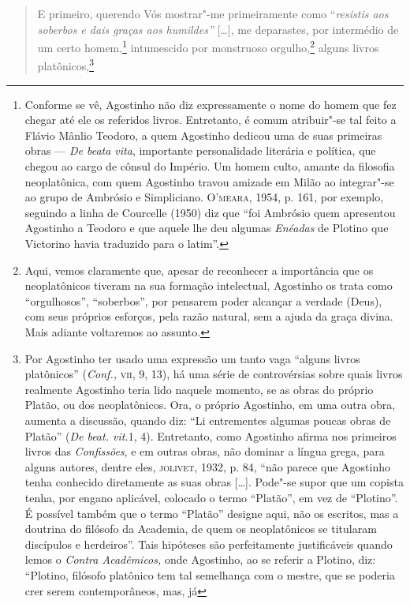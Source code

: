 \begin{quote}
E primeiro, querendo Vós mostrar"-me primeiramente como
``\emph{resistis aos soberbos e dais graças aos humildes''}
[\ldots{}], me deparastes, por intermédio de um certo
homem,\footnote{ Conforme se  vê, Agostinho não diz expressamente
o nome do homem que fez chegar até ele os referidos livros.
Entretanto, é comum atribuir"-se tal feito a Flávio Mânlio
Teodoro, a quem Agostinho dedicou uma de suas primeiras obras ---
\emph{De beata vita}, importante personalidade
literária e política, que chegou ao cargo de cônsul do Império.
Um homem culto, amante da filosofia neoplatônica, com quem
Agostinho travou  amizade em Milão ao integrar"-se ao grupo de
Ambrósio e Simpliciano. O'\textsc{meara}, 1954, p. 161,  por exemplo,
seguindo a linha de Courcelle (1950) diz que “foi Ambrósio quem
apresentou Agostinho a Teodoro e que aquele lhe deu algumas
\emph{Enéadas} de Plotino que Victorino havia traduzido para o
latim”.} intumescido por monstruoso orgulho,\footnote{ Aqui,
vemos claramente que, apesar de reconhecer a importância que os
neoplatônicos tiveram na sua formação intelectual,  Agostinho os
trata como “orgulhosos”, “soberbos”,  por  pensarem poder
alcançar a verdade (Deus), com seus próprios esforços, pela
razão natural, sem a ajuda da graça divina. Mais adiante
voltaremos ao assunto.} alguns livros platônicos,\footnote{ Por
Agostinho ter  usado uma expressão um tanto vaga “alguns livros
platônicos” (\emph{Conf.,} \textsc{vii}, 9, 13),  há uma série de
controvérsias sobre quais livros  realmente Agostinho teria lido
naquele momento, se as obras do próprio  Platão, ou dos
neoplatônicos. Ora, o próprio Agostinho, em uma outra obra,
aumenta  a discussão, quando diz: “Li entrementes algumas
poucas obras de Platão” (\emph{De beat. vit.}1, 4).
Entretanto, como Agostinho afirma nos primeiros livros
das\emph{ Confissões}, e em outras obras, não dominar a língua
grega, para alguns autores, dentre eles, \textsc{jolivet}, 1932, p. 84,
“não parece que Agostinho tenha conhecido diretamente as suas
obras [\ldots{}]. Pode"-se supor que um copista tenha, por engano
aplicável, colocado o termo ``Platão'', em vez de ``Plotino''.  É
possível  também que o termo ``Platão'' designe aqui, não os
escritos, mas a doutrina do filósofo da Academia, de quem os
neoplatônicos se titularam discípulos e herdeiros”. Tais
hipóteses são perfeitamente justificáveis quando lemos o
\emph{Contra Acadêmicos,} onde Agostinho, ao se referir a
Plotino, diz: “Plotino,  filósofo platônico tem tal semelhança
com o mestre, que se poderia crer serem contemporâneos, mas, já
}
\end{quote}
